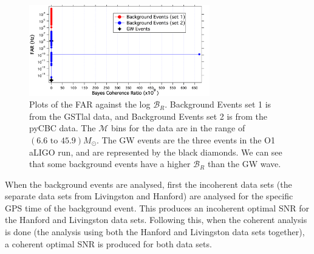 \documentclass{article}
\begin{document}
 
 \begin{figure}[h]
 	\centering
 	\includegraphics[width=0.7\textwidth]{Figures/Outlier.png} 
 	\caption{Plots of the FAR against the log $\mathcal{B}_{R}$. Background Events set 1 is from the GSTlal data, and Background Events set 2 is from the pyCBC data.  The $\mathcal{M}$ bins for the data are in the range of $(6.6  \text{ to } 45.9) M_{\odot}$. The GW events are the three events in the O1 aLIGO run, and are represented by the black diamonds. We can see that some background events have a higher $\mathcal{B}_{R}$ than the GW wave. }
 	\label{Fig:outlier}
 \end{figure}
 
 When the background events are analysed, first the incoherent data sets (the separate data sets from Livingston and Hanford) are analysed for the specific GPS time of the background event. This produces an incoherent optimal SNR for the Hanford and Livingston data sets. Following this, when the coherent analysis is done (the analysis using both the Hanford and Livingston data sets together), a coherent optimal SNR is produced for both data sets. \\
 
 
 
 
 
 
\end{document}
